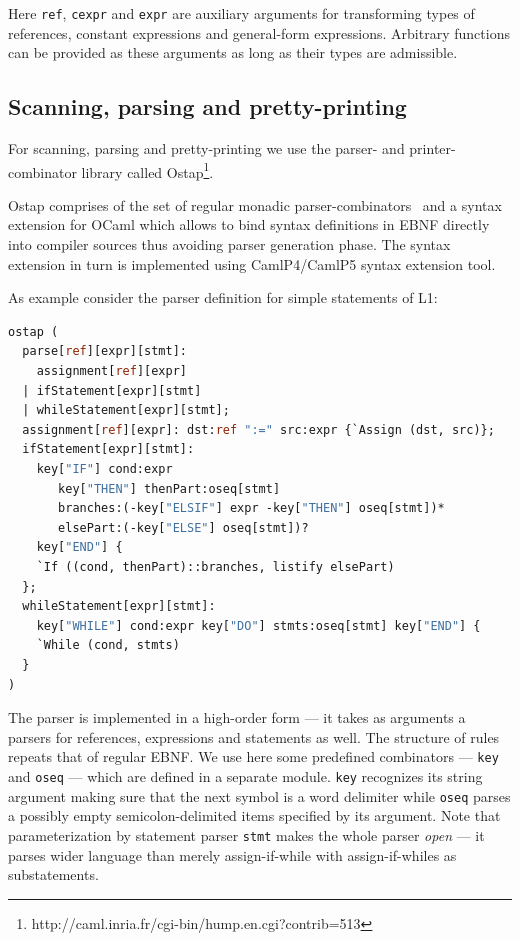 Here \lstinline{ref}, \lstinline{cexpr} and \lstinline{expr} are auxiliary arguments for transforming 
types of references, constant expressions and general-form expressions. Arbitrary functions can
be provided as these arguments as long as their types are admissible.


\subsection{Scanning, parsing and pretty-printing}

For scanning, parsing and pretty-printing we use the parser- and printer-combinator
library called Ostap\footnote{http://caml.inria.fr/cgi-bin/hump.en.cgi?contrib=513}. 

Ostap comprises of the set of regular monadic parser-combinators~\cite{MonadicParserCombinators} 
and a syntax extension for OCaml which allows to bind syntax definitions in
EBNF directly into compiler sources thus avoiding parser generation phase. The syntax
extension in turn is implemented using CamlP4/CamlP5 syntax extension 
tool. 

As example consider the parser definition for simple statements of L1:

\begin{lstlisting}[language=ocaml]
ostap (
  parse[ref][expr][stmt]: 
    assignment[ref][expr] 
  | ifStatement[expr][stmt] 
  | whileStatement[expr][stmt];
  assignment[ref][expr]: dst:ref ":=" src:expr {`Assign (dst, src)};
  ifStatement[expr][stmt]: 
    key["IF"] cond:expr 
       key["THEN"] thenPart:oseq[stmt]
       branches:(-key["ELSIF"] expr -key["THEN"] oseq[stmt])*
       elsePart:(-key["ELSE"] oseq[stmt])?
    key["END"] {
    `If ((cond, thenPart)::branches, listify elsePart)
  };
  whileStatement[expr][stmt]: 
    key["WHILE"] cond:expr key["DO"] stmts:oseq[stmt] key["END"] {
    `While (cond, stmts)
  }
)
\end{lstlisting}

The parser is implemented in a high-order form --- it takes as arguments a parsers
for references, expressions and statements as well. The structure of rules
repeats that of regular EBNF. We use here some predefined combinators --- \lstinline{key} 
and \lstinline{oseq} --- which are defined in a separate module. \lstinline{key} recognizes
its string argument making sure that the next symbol is a word delimiter while \lstinline{oseq}
parses a possibly empty semicolon-delimited items specified by its argument. Note that 
parameterization by statement parser \lstinline{stmt} makes the whole parser \emph{open} ---
it parses wider language than merely assign-if-while with assign-if-whiles as substatements.

